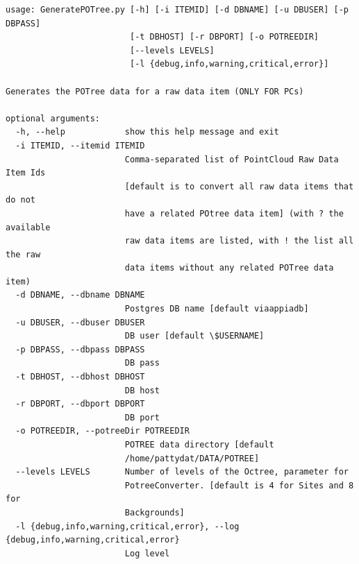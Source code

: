 \begin{Verbatim}[fontfamily=courier,commandchars=\\\{\},fontsize=\footnotesize]
usage: GeneratePOTree.py [-h] [-i ITEMID] [-d DBNAME] [-u DBUSER] [-p DBPASS]
                         [-t DBHOST] [-r DBPORT] [-o POTREEDIR]
                         [--levels LEVELS]
                         [-l {debug,info,warning,critical,error}]

Generates the POTree data for a raw data item (ONLY FOR PCs)

optional arguments:
  -h, --help            show this help message and exit
  -i ITEMID, --itemid ITEMID
                        Comma-separated list of PointCloud Raw Data Item Ids
                        [default is to convert all raw data items that do not
                        have a related POtree data item] (with ? the available
                        raw data items are listed, with ! the list all the raw
                        data items without any related POTree data item)
  -d DBNAME, --dbname DBNAME
                        Postgres DB name [default viaappiadb]
  -u DBUSER, --dbuser DBUSER
                        DB user [default \$USERNAME]
  -p DBPASS, --dbpass DBPASS
                        DB pass
  -t DBHOST, --dbhost DBHOST
                        DB host
  -r DBPORT, --dbport DBPORT
                        DB port
  -o POTREEDIR, --potreeDir POTREEDIR
                        POTREE data directory [default
                        /home/pattydat/DATA/POTREE]
  --levels LEVELS       Number of levels of the Octree, parameter for
                        PotreeConverter. [default is 4 for Sites and 8 for
                        Backgrounds]
  -l {debug,info,warning,critical,error}, --log {debug,info,warning,critical,error}
                        Log level
\end{Verbatim}
